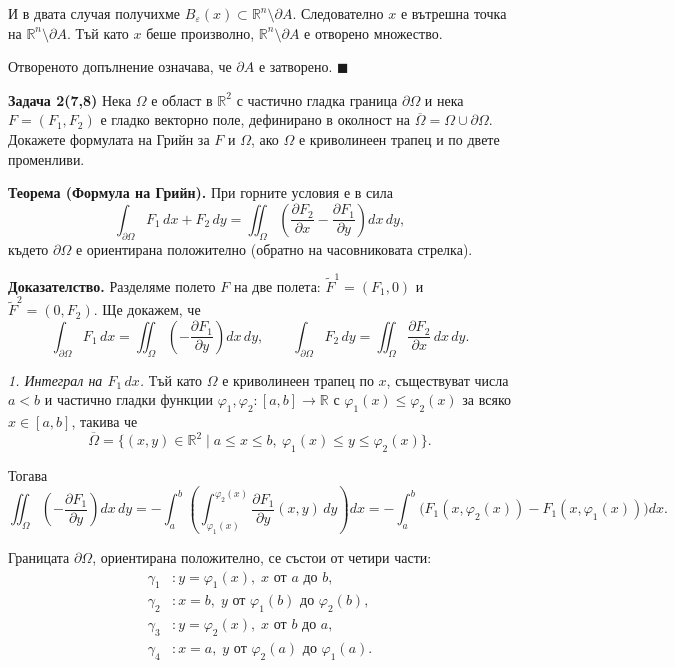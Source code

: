 \documentclass[10pt]{article}
\begin{document}
И в двата случая получихме $B_\varepsilon(x) \subset \mathbb{R}^n \setminus \partial A$.  
Следователно $x$ е вътрешна точка на $\mathbb{R}^n \setminus \partial A$.  
Тъй като $x$ беше произволно, $\mathbb{R}^n \setminus \partial A$ е отворено множество.

Отвореното допълнение означава, че $\partial A$ е затворено. $\blacksquare$

\textbf{Задача 2(7,8) }Нека $\Omega$ е област в $\mathbb{R}^2$ с частично гладка граница $\partial\Omega$ и нека $F = (F_1, F_2)$ е гладко векторно поле, дефинирано в околност на $\overline{\Omega} = \Omega \cup \partial\Omega$. Докажете формулата на Грийн за $F$ и $\Omega$, ако $\Omega$ е криволинеен трапец и по двете променливи. 

\textbf{Теорема (Формула на Грийн).} 
При горните условия е в сила
\[
\int_{\partial\Omega} F_1\,dx + F_2\,dy = \iint_{\Omega} \left( \frac{\partial F_2}{\partial x} - \frac{\partial F_1}{\partial y} \right) dx\,dy,
\]
където $\partial\Omega$ е ориентирана положително (обратно на часовниковата стрелка).

\textbf{Доказателство.} 
Разделяме полето $F$ на две полета: $\tilde{F}^1 = (F_1,0)$ и $\tilde{F}^2 = (0,F_2)$. Ще докажем, че
\[
\int_{\partial\Omega} F_1\,dx = \iint_{\Omega} \left( -\frac{\partial F_1}{\partial y} \right) dx\,dy, \qquad
\int_{\partial\Omega} F_2\,dy = \iint_{\Omega} \frac{\partial F_2}{\partial x} \, dx\,dy.
\]

\textit{1. Интеграл на $F_1\,dx$.} 
Тъй като $\Omega$ е криволинеен трапец по $x$, съществуват числа $a < b$ и частично гладки функции $\varphi_1, \varphi_2 : [a,b] \to \mathbb{R}$ с $\varphi_1(x) \le \varphi_2(x)$ за всяко $x \in [a,b]$, такива че
\[
\overline{\Omega} = \{ (x,y) \in \mathbb{R}^2 \mid a \le x \le b,\ \varphi_1(x) \le y \le \varphi_2(x) \}.
\]

Тогава
\[
\iint_{\Omega} \left( -\frac{\partial F_1}{\partial y} \right) dx\,dy 
= -\int_a^b \left( \int_{\varphi_1(x)}^{\varphi_2(x)} \frac{\partial F_1}{\partial y}(x,y)\,dy \right) dx
= -\int_a^b \bigl( F_1(x,\varphi_2(x)) - F_1(x,\varphi_1(x)) \bigr) dx.
\]

Границата $\partial\Omega$, ориентирана положително, се състои от четири части:
\begin{align*}
\gamma_1 &: y = \varphi_1(x),\; x \text{ от } a \text{ до } b, \\
\gamma_2 &: x = b,\; y \text{ от } \varphi_1(b) \text{ до } \varphi_2(b), \\
\gamma_3 &: y = \varphi_2(x),\; x \text{ от } b \text{ до } a, \\
\gamma_4 &: x = a,\; y \text{ от } \varphi_2(a) \text{ до } \varphi_1(a).
\end{align*}
\end{document}
